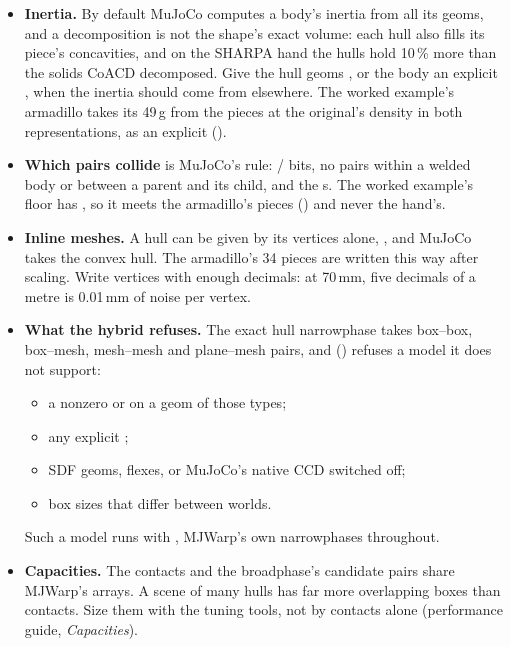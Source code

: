 \begin{itemize}
\item \textbf{Inertia.} By default MuJoCo computes a body's inertia from all its geoms, and a decomposition is not the shape's exact volume: each hull also fills its piece's concavities, and on the SHARPA hand the hulls hold 10\,\% more than the solids CoACD decomposed. Give the hull geoms , or the body an explicit , when the inertia should come from elsewhere. The worked example's armadillo takes its 49\,g from the pieces at the original's density in both representations, as an explicit  ().
\item \textbf{Which pairs collide} is MuJoCo's rule: / bits, no pairs within a welded body or between a parent and its child, and the s. The worked example's floor has , so it meets the armadillo's pieces () and never the hand's.
\item \textbf{Inline meshes.} A hull can be given by its vertices alone, , and MuJoCo takes the convex hull. The armadillo's 34 pieces are written this way after scaling. Write vertices with enough decimals: at 70\,mm, five decimals of a metre is 0.01\,mm of noise per vertex.
\item \textbf{What the hybrid refuses.} The exact hull narrowphase takes box--box, box--mesh, mesh--mesh and plane--mesh pairs, and  () refuses a model it does not support:
  \begin{itemize}
  \item a nonzero  or  on a geom of those types;
  \item any explicit ;
  \item SDF geoms, flexes, or MuJoCo's native CCD switched off;
  \item box sizes that differ between worlds.
  \end{itemize}
  Such a model runs with , MJWarp's own narrowphases throughout.
\item \textbf{Capacities.} The contacts and the broadphase's candidate pairs share MJWarp's  arrays. A scene of many hulls has far more overlapping boxes than contacts. Size them with the tuning tools, not by contacts alone (performance guide, \emph{Capacities}).
\end{itemize}

